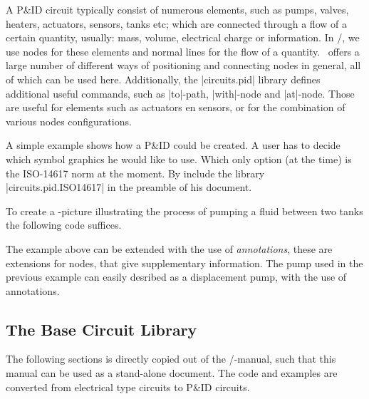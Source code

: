 \documentclass[a4paper]{ltxdoc}
\begin{document}
A P\&ID circuit typically consist of numerous elements, such as pumps, valves, heaters, actuators, sensors, tanks etc; which are connected through a flow of a certain quantity, usually: mass, volume, electrical charge or information. In
\pgfname/\tikzname, we use nodes for these elements and normal lines for the  flow of a quantity. \tikzname\ offers a large number of different ways of positioning and connecting nodes in general, all of which can be used here. Additionally, the |circuits.pid| library defines additional useful commands, such as |to|-path, |with|-node and |at|-node. Those are useful for elements such as actuators en sensors, or for the combination of various nodes configurations.

A simple example shows how a P\&ID could be created. A user has to decide which symbol graphics he would like to use. Which only option (at the time) is the ISO-14617 norm at the moment. By include the library |circuits.pid.ISO14617| in the preamble of his document.
\begin{codeexample}
 \usetikzlibrary{circuits.pid.ISO14617}
\end{codeexample}
To create a \tikzname-picture illustrating the process of pumping a fluid between two tanks the following code suffices.
\begin{codeexample}[]
\end{codeexample}
The example above can be extended with the use of \emph{annotations}, these are extensions for nodes, that give supplementary information. The pump used in the previous example can easily desribed as a displacement pump, with the use of annotations.
\begin{codeexample}[]
\end{codeexample}

\subsection{The Base Circuit Library}
The following sections is directly copied out of the \pgfname/\tikzname-manual, such that this manual can be used as a stand-alone document. The code and examples are converted from electrical type circuits to  P\&ID circuits.
\end{document}

